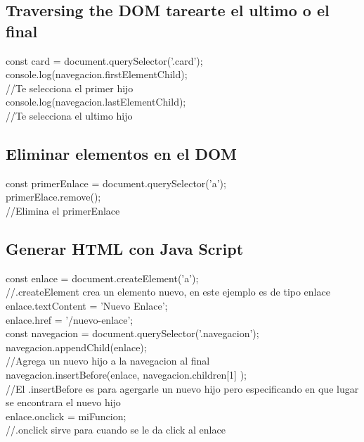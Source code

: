 \documentclass[10pt,a4paper]{article}
\begin{document}
\subsection{Traversing the DOM tarearte el ultimo o el final}
const card = document.querySelector('.card');
console.log(navegacion.firstElementChild);\\
//Te selecciona el primer hijo \\
console.log(navegacion.lastElementChild);\\
//Te selecciona el ultimo hijo \\
\subsection{Eliminar elementos en el DOM}
const primerEnlace = document.querySelector('a'); \\
primerElace.remove(); \\
//Elimina el primerEnlace \\
\newpage 
\subsection{Generar HTML con Java Script}
const enlace = document.createElement('a');\\ 
//.createElement crea un elemento nuevo, en este ejemplo es de tipo enlace \\
enlace.textContent = 'Nuevo Enlace'; \\
enlace.href = '/nuevo-enlace';\\
const navegacion = document.querySelector('.navegacion'); \\
navegacion.appendChild(enlace); \\
//Agrega un nuevo hijo a la navegacion al final \\
navegacion.insertBefore(enlace, navegacion.children[1] ); \\
//El .insertBefore es para agergarle un nuevo hijo pero especificando en que lugar se encontrara el nuevo hijo\\
enlace.onclick = miFuncion; \\
//.onclick sirve para cuando se le da click al enlace \\
\end{document}
